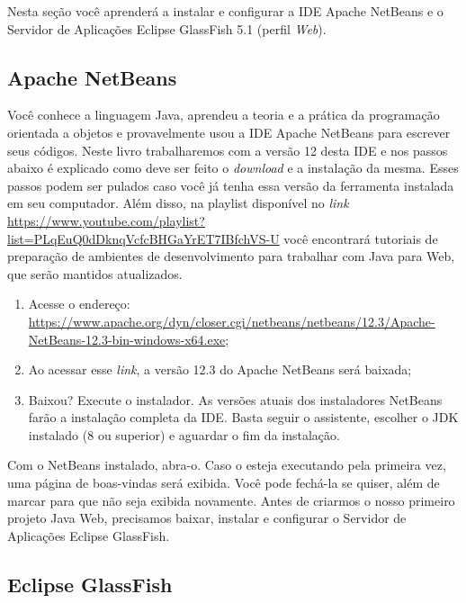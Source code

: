 Nesta seção você aprenderá a instalar e configurar a IDE Apache NetBeans e o Servidor de Aplicações Eclipse GlassFish 5.1 (perfil \textit{Web}).


\subsection{Apache NetBeans}

Você conhece a linguagem Java, aprendeu a teoria e a prática da programação orientada a objetos e provavelmente usou a IDE Apache NetBeans para escrever seus códigos. Neste livro trabalharemos com a versão 12 desta IDE e nos passos abaixo é explicado como deve ser feito o \textit{download} e a instalação da mesma. Esses passos podem ser pulados caso você já tenha essa versão da ferramenta instalada em seu computador. Além disso, na playlist disponível no \textit{link} \url{https://www.youtube.com/playlist?list=PLqEuQ0dDknqVcfcBHGaYrET7IBfchVS-U} você encontrará tutoriais de preparação de ambientes de desenvolvimento para trabalhar com Java para Web, que serão mantidos atualizados.

\begin{enumerate}

    \item Acesse o endereço: \url{https://www.apache.org/dyn/closer.cgi/netbeans/netbeans/12.3/Apache-NetBeans-12.3-bin-windows-x64.exe};
    
    \item Ao acessar esse \textit{link}, a versão 12.3 do Apache NetBeans será baixada;
    
    \item Baixou? Execute o instalador. As versões atuais dos instaladores NetBeans farão a instalação completa da IDE. Basta seguir o assistente, escolher o JDK instalado (8 ou superior) e aguardar o fim da instalação.
    
\end{enumerate}

Com o NetBeans instalado, abra-o. Caso o esteja executando pela primeira vez, uma página de boas-vindas será exibida. Você pode fechá-la se quiser, além de marcar para que não seja exibida novamente. Antes de criarmos o nosso primeiro projeto Java Web, precisamos baixar, instalar e configurar o Servidor de Aplicações Eclipse GlassFish.


\subsection{Eclipse GlassFish}


